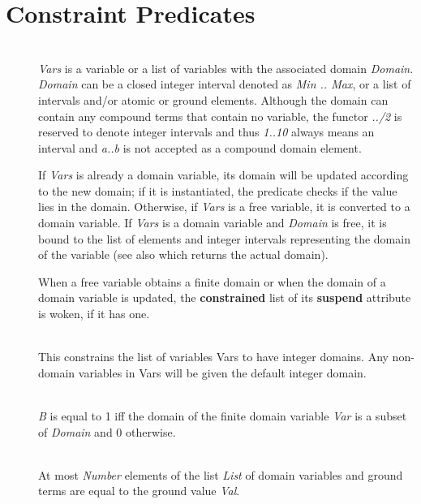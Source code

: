\section{Constraint Predicates}
\begin{description}
\item[] \ \\
{\it Vars} is a variable or a list of variables
with the associated domain {\it Domain}.
{\it Domain} can be a closed integer interval denoted as {\it Min .. Max},
or a list of intervals and/or atomic or ground elements.
Although the domain can contain any compound terms that contain
no variable,
the functor {\it ../2} is reserved to denote integer intervals
and thus {\it 1..10} always means an interval and {\it a..b}
is not accepted as a compound domain element.

If {\it Vars} is already a domain variable, its domain will be updated
according to the new domain; if it is instantiated, the predicate checks
if the value lies in the domain.
Otherwise, if {\it Vars} is a free variable, it is converted to a domain
variable.
If {\it Vars} is a domain variable and {\it Domain} is free,
it is bound to the list of elements and integer intervals
representing the domain of the variable
(see also  which returns the actual domain).

When a free variable obtains a finite domain or when the domain
of a domain variable is updated, the {\bf constrained}
list of its {\bf suspend} attribute is woken, if it has one.

\item[] \ \\
This constrains the list of variables Vars to have integer domains. Any
non-domain variables in Vars will be given the default integer domain.

\item[] \ \\
{\it B} is equal to 1 iff the domain of the finite domain variable {\it Var}
is a subset of {\it Domain} and 0 otherwise.

\item[] \ \\
At most {\it Number} elements of the list {\it List} of domain variables
and ground terms are equal to the ground value {\it Val}.


\end{description}
